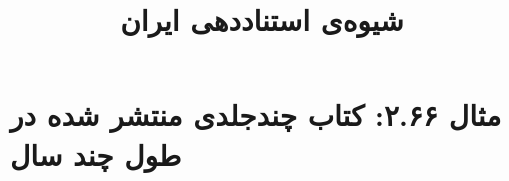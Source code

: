 \documentclass[a4paper,10pt]{article}
\begin{document}
\title{شیوه‌ی استناددهی ایران
 }
\author{}
\date{}
\maketitle



\section*{مثال ۲.۶۶: کتاب چندجلدی منتشر شده در طول چند سال}

\cite{جبلی1339}\\
\cite{فرد1370}\\
\cite{سینایی1382}\\
\cite{wrihght1968}\\
\cite{hayek1988}\\
\cite{freeman1951}\\






\end{document}
